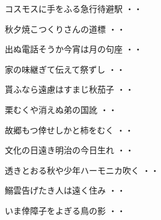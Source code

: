 \vspace{0.6cm}
\begin{shiika}コスモスに手をふる急行待避駅
\hfill{・・}\end{shiika}
\vspace{0.6cm}
\begin{shiika}秋夕焼こつくりさんの道標
\hfill{・・}\end{shiika}
\vspace{0.6cm}
\begin{shiika}出ぬ電話そうか今宵は月の句座
\hfill{・・}\end{shiika}
\vspace{0.6cm}
\begin{shiika}家の味継ぎて伝えて祭ずし
\hfill{・・}\end{shiika}
\vspace{0.6cm}
\begin{shiika}貰ふなら遠慮はすまじ秋茄子
\hfill{・・}\end{shiika}
\vspace{0.6cm}
\begin{shiika}栗むくや消えぬ弟の国訛
\hfill{・・}\end{shiika}
\vspace{0.6cm}
\begin{shiika}故郷もつ倖せしかと柿をむく
\hfill{・・}\end{shiika}
\vspace{0.6cm}
\begin{shiika}文化の日遠き明治の今日生れ
\hfill{・・}\end{shiika}
\vspace{0.6cm}
\begin{shiika}透きとおる秋や少年ハーモニカ吹く
\hfill{・・}\end{shiika}
\vspace{0.6cm}
\begin{shiika}鰯雲告げたき人は遠く住み
\hfill{・・}\end{shiika}
\vspace{0.6cm}
\begin{shiika}いま倖障子をよぎる鳥の影
\hfill{・・}\end{shiika}
